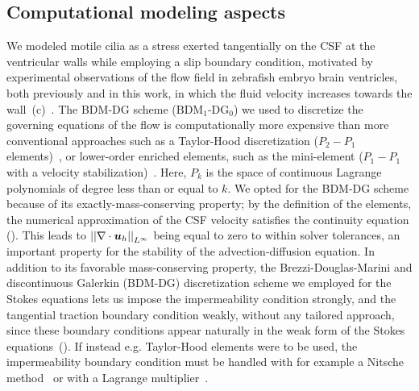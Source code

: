 \documentclass{WileyMSP-template}
\begin{document}
\subsection{Computational modeling aspects}
We modeled motile cilia as a stress
exerted tangentially on the CSF at the ventricular walls
while employing a slip boundary condition,
motivated by experimental observations of the
flow field in zebrafish embryo brain ventricles, both previously and in this work, in which
the fluid velocity increases towards the
wall~(c)~\cite{Olstad2019CiliaryDevelopment}. 
The BDM-DG scheme ($\mathrm{BDM}_1$-$\mathrm{DG}_0$) we used to discretize the
governing equations of the flow is computationally more expensive
than more conventional approaches such as a
Taylor-Hood discretization
($P_2-P_1$ elements)~\cite{Stenberg1990ErrorProblem}, or lower-order enriched
elements, such as the mini-element
($P_1-P_1$ with a velocity stabilization)~\cite{Brezzi2011MixedMethods}.
Here, $P_k$ is the space of continuous Lagrange polynomials of degree less
than or equal to $k$.
We opted for the BDM-DG scheme because of its exactly-mass-conserving property;
by the definition of the elements, the numerical approximation of
the CSF velocity satisfies the continuity equation ().
This leads to ${\vert\vert\nabla\cdot\bm{u}_h\vert\vert}_{L^{\infty}}$ being equal to zero to within solver tolerances,
an important property for the stability of the advection-diffusion equation\cite{CITATION}.
In addition to its favorable mass-conserving property, the 
Brezzi-Douglas-Marini and discontinuous Galerkin (BDM-DG) discretization scheme 
we employed for the Stokes equations
lets us impose the impermeability condition strongly, and the tangential
traction boundary condition weakly, without any tailored approach,
since these boundary conditions appear naturally in the weak form of the
Stokes equations~(). If instead e.g. Taylor-Hood
elements were to be used, the impermeability boundary condition must
be handled with for example a Nitsche method~\cite{Nitsche1971UberSind}
or with a Lagrange multiplier~\cite{Babuska1973TheMultipliers,
Bertoluzza2017BoundaryHemodynamics}.
\end{document}
